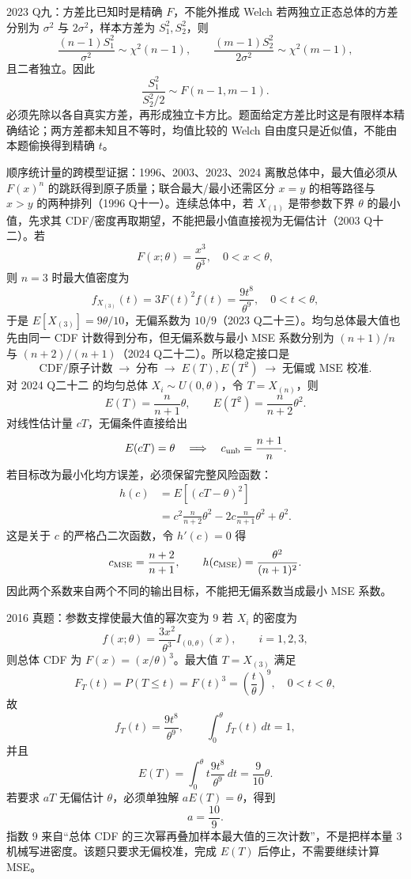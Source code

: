\documentclass[11pt,a4paper]{ctexart}
\begin{document}
\begin{examplebox}{2023 Q九：方差比已知时是精确 $F$，不能外推成 Welch}
若两独立正态总体的方差分别为 $\sigma^2$ 与 $2\sigma^2$，样本方差为 $S_1^2,S_2^2$，则
\[
\frac{(n-1)S_1^2}{\sigma^2}\sim\chi^2(n-1),\qquad
\frac{(m-1)S_2^2}{2\sigma^2}\sim\chi^2(m-1),
\]
且二者独立。因此
\[
\frac{S_1^2}{S_2^2/2}\sim F(n-1,m-1).
\]
必须先除以各自真实方差，再形成独立卡方比。题面给定方差比时这是有限样本精确结论；两方差都未知且不等时，均值比较的 Welch 自由度只是近似值，不能由本题偷换得到精确 $t$。
\end{examplebox}

\begin{examplebox}{顺序统计量的跨模型证据：1996、2003、2023、2024}
离散总体中，最大值必须从 $F(x)^n$ 的跳跃得到原子质量；联合最大/最小还需区分 $x=y$ 的相等路径与 $x>y$ 的两种排列（1996 Q十一）。连续总体中，若 $X_{(1)}$ 是带参数下界 $\theta$ 的最小值，先求其 CDF/密度再取期望，不能把最小值直接视为无偏估计（2003 Q十二）。若
\[
F(x;\theta)=\frac{x^3}{\theta^3},\quad 0<x<\theta,
\]
则 $n=3$ 时最大值密度为
\[
f_{X_{(3)}}(t)=3F(t)^2f(t)=\frac{9t^8}{\theta^9},\quad 0<t<\theta,
\]
于是 $E[X_{(3)}]=9\theta/10$，无偏系数为 $10/9$（2023 Q二十三）。均匀总体最大值也先由同一 CDF 计数得到分布，但无偏系数与最小 MSE 系数分别为 $(n+1)/n$ 与 $(n+2)/(n+1)$（2024 Q二十二）。所以稳定接口是
\[
\boxed{\text{CDF/原子计数}\;\to\;\text{分布}\;\to\;E(T),E(T^2)\;\to\;\text{无偏或 MSE 校准}}.
\]
对 2024 Q二十二 的均匀总体 $X_i\sim U(0,\theta)$，令 $T=X_{(n)}$，则
\[
E(T)=\frac{n}{n+1}\theta,\qquad E(T^2)=\frac{n}{n+2}\theta^2.
\]
对线性估计量 $cT$，无偏条件直接给出
\[
E(cT)=\theta\quad\Longrightarrow\quad c_{\rm unb}=\frac{n+1}{n}.
\]
若目标改为最小化均方误差，必须保留完整风险函数：
\[
\begin{aligned}
h(c)&=E[(cT-\theta)^2]\\
&=c^2\frac{n}{n+2}\theta^2-2c\frac{n}{n+1}\theta^2+\theta^2.
\end{aligned}
\]
这是关于 $c$ 的严格凸二次函数，令 $h'(c)=0$ 得
\[
c_{\rm MSE}=\frac{n+2}{n+1},\qquad h(c_{\rm MSE})=\frac{\theta^2}{(n+1)^2}.
\]
因此两个系数来自两个不同的输出目标，不能把无偏系数当成最小 MSE 系数。
\end{examplebox}

\begin{methodbox}{2016 真题：参数支撑使最大值的幂次变为 $9$}
若 $X_i$ 的密度为
\[
f(x;\theta)=\frac{3x^2}{\theta^3}I_{(0,\theta)}(x),\qquad i=1,2,3,
\]
则总体 CDF 为 $F(x)=(x/\theta)^3$。最大值 $T=X_{(3)}$ 满足
\[
F_T(t)=P(T\le t)=F(t)^3=\left(\frac{t}{\theta}\right)^9,
\quad 0<t<\theta,
\]
故
\[
f_T(t)=\frac{9t^8}{\theta^9},\qquad
\int_0^\theta f_T(t)\,dt=1,
\]
并且
\[
E(T)=\int_0^\theta t\frac{9t^8}{\theta^9}\,dt=\frac9{10}\theta.
\]
若要求 $aT$ 无偏估计 $\theta$，必须单独解 $aE(T)=\theta$，得到
\[
a=\frac{10}{9}.
\]
指数 $9$ 来自“总体 CDF 的三次幂再叠加样本最大值的三次计数”，不是把样本量 $3$ 机械写进密度。该题只要求无偏校准，完成 $E(T)$ 后停止，不需要继续计算 MSE。
\end{methodbox}
\end{document}
